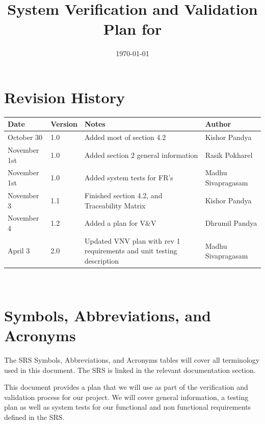 \documentclass[12pt, titlepage]{article}
\begin{document}
\title{System Verification and Validation Plan for \progname{}} 
\author{\authname}
\date{\today}
	
\maketitle


\section*{Revision History}

\begin{tabularx}{\textwidth}{p{3cm}p{3cm}p{3cm}X}
\toprule {\bf Date} & {\bf Version} & {\bf Notes} & {\bf Author}\\
\midrule
October 30 & 1.0 & Added most of section 4.2 & Kishor Pandya\\
November 1st & 1.0 & Added section 2 general information & Rasik Pokharel\\
November 1st & 1.0 & Added system tests for FR's & Madhu Sivapragasam\\
November 3 & 1.1 & Finished section 4.2, and Traceability Matrix & Kishor Pandya\\
November 4 & 1.2 & Added a plan for V\&V & Dhrumil Pandya\\
April 3 & 2.0 & Updated VNV plan with rev 1 requirements and unit testing description & Madhu Sivapragasam\\
\bottomrule
\end{tabularx}

~\\
\newpage

\tableofcontents

\listoftables

\newpage

\section{Symbols, Abbreviations, and Acronyms}

The SRS Symbols, Abbreviations, and Acronyms tables will cover all terminology used in this document. The SRS is linked in the relevant documentation section. 

\newpage


This document provides a plan that we will use as part of the verification and validation process for our project. We will cover general information, a testing plan as well as system tests for our functional and non functional requirements defined in the SRS. 
\end{document}
